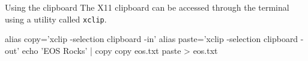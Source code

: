 \begin{block}{Using the clipboard}
  The X11 clipboard can be accessed through the terminal using a utility called \texttt{xclip}.
  \begin{indented}
    \begin{bashcode}
      alias copy='xclip -selection clipboard -in'
      alias paste='xclip -selection clipboard -out'
      echo 'EOS Rocks' | copy
      copy eos.txt
      paste > eos.txt
    \end{bashcode}
  \end{indented}
\end{block}

